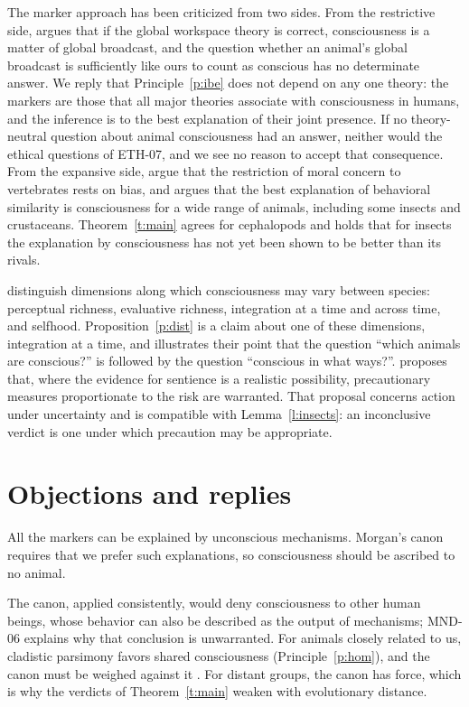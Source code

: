 \documentclass{situationist-preprint}
\begin{document}
The marker approach has been criticized from two sides. From the restrictive side, \citet{Carruthers2019} argues that if the global workspace theory is correct, consciousness is a matter of global broadcast, and the question whether an animal's global broadcast is sufficiently like ours to count as conscious has no determinate answer. We reply that Principle~\ref{p:ibe} does not depend on any one theory: the markers are those that all major theories associate with consciousness in humans, and the inference is to the best explanation of their joint presence. If no theory-neutral question about animal consciousness had an answer, neither would the ethical questions of ETH-07, and we see no reason to accept that consequence. From the expansive side, \citet{Mikhalevich2020} argue that the restriction of moral concern to vertebrates rests on bias, and \citet{Tye2017} argues that the best explanation of behavioral similarity is consciousness for a wide range of animals, including some insects and crustaceans. Theorem~\ref{t:main} agrees for cephalopods and holds that for insects the explanation by consciousness has not yet been shown to be better than its rivals.

\citet{Birch2020} distinguish dimensions along which consciousness may vary between species: perceptual richness, evaluative richness, integration at a time and across time, and selfhood. Proposition~\ref{p:dist} is a claim about one of these dimensions, integration at a time, and illustrates their point that the question \enquote{which animals are conscious?} is followed by the question \enquote{conscious in what ways?}. \citet{Birch2024} proposes that, where the evidence for sentience is a realistic possibility, precautionary measures proportionate to the risk are warranted. That proposal concerns action under uncertainty and is compatible with Lemma~\ref{l:insects}: an inconclusive verdict is one under which precaution may be appropriate.

\section{Objections and replies}

\begin{objection}\label{o:morgan}
All the markers can be explained by unconscious mechanisms. Morgan's canon requires that we prefer such explanations, so consciousness should be ascribed to no animal.
\end{objection}

\begin{reply}
The canon, applied consistently, would deny consciousness to other human beings, whose behavior can also be described as the output of mechanisms; MND-06 explains why that conclusion is unwarranted. For animals closely related to us, cladistic parsimony favors shared consciousness (Principle~\ref{p:hom}), and the canon must be weighed against it \citep{Sober2005}. For distant groups, the canon has force, which is why the verdicts of Theorem~\ref{t:main} weaken with evolutionary distance.
\end{reply}
\end{document}
